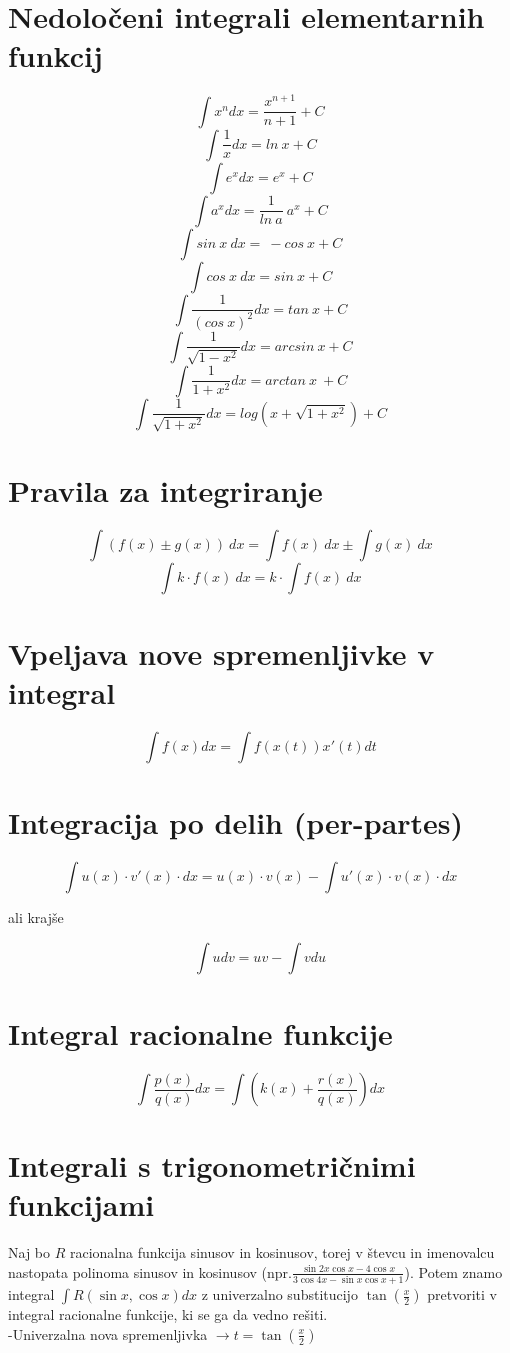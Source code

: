 \documentclass[12pt]{report}
\begin{document}
\section*{Nedoločeni integrali elementarnih funkcij}
\begin{multicols}{2}
\[\int x^ndx=\frac{x^{n+1}}{n+1}+C\]
\[\int \frac{1}{x}dx=ln\ x+C\]	
\[\int e^xdx=e^x+C\]
\[\int a^xdx=\frac{1}{ln\ a}{\ a}^x+C\]
\[\int sin\ x\ dx=\ -cos\ x+C\]
\columnbreak
\[\int cos\ x\ dx=sin\ x+C\]
\[\int \frac{1}{{(cos\ x)}^2}dx=tan\ x+C\]
\[\int \frac{1}{\sqrt{1-x^2}}dx=arcsin\ x+C\]
\[\int \frac{1}{1+x^2}dx=arctan\ x\ +C\]
\[\int \frac{1}{\sqrt{1+x^2}}dx=log(x+\sqrt{1+x^2})+C\]
\end{multicols}

	


\section*{Pravila za integriranje}
\[ \int (f(x)\pm g(x))\ dx=\int f(x)\ dx\pm\int g(x)\ dx\]
\[\int k\cdot f(x)\ dx=k\cdot\int f(x)\ dx\]

\section*{Vpeljava nove spremenljivke v integral}
\[\int f(x)dx=\int f(x(t))x'(t)dt\]

\section*{Integracija po delih (per-partes)}
\[\int u(x)\cdot v'(x)\cdot dx=u(x)\cdot v(x)-\int u'(x)\cdot v(x)\cdot dx\]

ali krajše

\[\int udv=u v-\int v du\]

\section*{Integral racionalne funkcije}
\[\int \frac{p(x)}{q(x)}dx=\int\left(k(x)+\frac{r(x)}{q(x)}\right)dx\]

\section*{Integrali s trigonometričnimi funkcijami}
Naj bo $R$ racionalna funkcija sinusov in kosinusov, torej v števcu in imenovalcu nastopata polinoma sinusov in kosinusov (npr.$\frac{\sin 2x \cos x-4 \cos x}{3\cos 4x -\sin x \cos x +1}$). Potem znamo integral  $\int R(\sin x, \cos x)dx$ z univerzalno substitucijo $\tan(\frac{x}{2})$ pretvoriti v integral racionalne funkcije, ki se ga da vedno rešiti.\\
\bigbreak
-Univerzalna nova spremenljivka $\to t = \tan(\frac{x}{2})$
 
\end{document}
